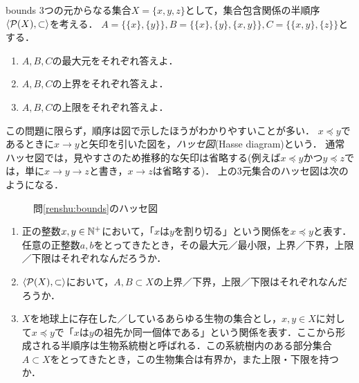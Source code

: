 \documentclass[dvipdfmx,11pt,a4paper]{jsarticle}
\begin{document}
\begin{renshu}{}{bounds}
3つの元からなる集合$X = \{x, y, z\}$として，集合包含関係の半順序$\langle \mathcal{P}(X), \subset \rangle$を考える．
$A = \{ \{x\}, \{y\} \}, B = \{ \{x\}, \{y\}, \{x, y\} \}, C = \{ \{x,y\}, \{z\} \}$とする．
\begin{enumerate}
 \item $A, B, C$の最大元をそれぞれ答えよ．%
 \item $A, B, C$の上界をそれぞれ答えよ．  %
 \item $A, B, C$の上限をそれぞれ答えよ．  %
\end{enumerate}
\end{renshu}

この問題に限らず，順序は図で示したほうがわかりやすいことが多い．
$x \preceq y$であるときに$x \to y$と矢印を引いた図を，\emph{ハッセ図}(Hasse diagram)という．
通常ハッセ図では，見やすさのため推移的な矢印は省略する(例えば$x \preceq y$かつ$y \preceq z$では，単に$x \to y \to z$と書き，$x \to z$は省略する)．
上の3元集合のハッセ図は次のようになる．
\begin{figure}[h]
\centering
{}
\caption{問\ref{renshu:bounds}のハッセ図}
\label{fig:hasse} 
\end{figure}

\begin{renshu}{}{}
\begin{enumerate}
  \item 正の整数$x, y \in \mathbb{N}^+$において，「$x$は$y$を割り切る」という関係を$x \preceq y$と表す．
  任意の正整数$a,b$をとってきたとき，その最大元／最小限，上界／下界，上限／下限はそれぞれなんだろうか．
  \item $\langle \mathcal{P}(X), \subset \rangle$において，$A, B \subset X$の上界／下界，上限／下限はそれぞれなんだろうか．
  \item $X$を地球上に存在した／しているあらゆる生物の集合とし，$x, y \in X$に対して$x \preceq y$で「$x$は$y$の祖先か同一個体である」という関係を表す．ここから形成される半順序は生物系統樹と呼ばれる．この系統樹内のある部分集合$A \subset X$をとってきたとき，この生物集合は有界か，また上限・下限を持つか．
\end{enumerate}
\end{renshu}
\end{document}
